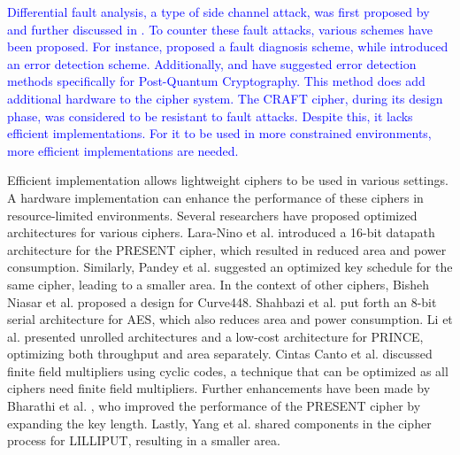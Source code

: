 \documentclass[final,5p,times,twocolumn]{elsarticle}
\begin{document}
\textcolor{blue}{Differential fault analysis, a type of side channel attack, was first proposed by \cite{Biham1997} and further discussed in \cite{Kermani}. To counter these fault attacks, various schemes have been proposed. For instance, \cite{Kermani2019} proposed a fault diagnosis scheme, while \cite{Kaur2024} introduced an error detection scheme. Additionally, \cite{CintasCanto2022} and \cite{Canto2023} have suggested error detection methods specifically for Post-Quantum Cryptography. This method does add additional hardware to the cipher system. The CRAFT cipher, during its design phase, was considered to be resistant to fault attacks. Despite this, it lacks efficient implementations. For it to be used in more constrained environments, more efficient implementations are needed.}


Efficient implementation allows lightweight ciphers to be used in various settings.
A hardware implementation can enhance the performance of these ciphers in resource-limited environments.
Several researchers have proposed optimized architectures for various ciphers.
Lara-Nino et al. \cite{LaraNino2017} introduced a 16-bit datapath architecture for the PRESENT cipher, which resulted in reduced area and power consumption. 
Similarly, Pandey et al. \cite{Pandey2019} suggested an optimized key schedule for the same cipher, leading to a smaller area.
\color{blue}
In the context of other ciphers, Bisheh Niasar et al. \cite{BishehNiasar2020} proposed a design for Curve448. 
Shahbazi et al. \cite{Shahbazi2021} put forth an 8-bit serial architecture for AES, which also reduces area and power consumption. 
Li et al. \cite{Li2021} presented unrolled architectures and a low-cost architecture for PRINCE, optimizing both throughput and area separately. 
Cintas Canto et al. \cite{CintasCanto2023} discussed finite field multipliers using cyclic codes, a technique that can be optimized as all ciphers need finite field multipliers.
\color{black}
Further enhancements have been made by Bharathi et al. \cite{Bharathi2022}, who improved the performance of the PRESENT cipher by expanding the key length. 
Lastly, Yang et al. \cite{Yang2023} shared components in the cipher process for LILLIPUT, resulting in a smaller area.
\end{document}
